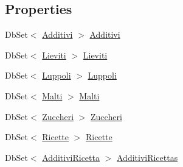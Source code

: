 \subsection*{Properties}
\begin{DoxyCompactItemize}
\item 
Db\+Set$<$ \mbox{\hyperlink{class_brew_day2_1_1_models_1_1_additivi}{Additivi}} $>$ \mbox{\hyperlink{class_brew_day2_1_1_models_1_1_application_db_context_a9da0337ce439d4e85e35127e607097b6}{Additivi}}
\item 
Db\+Set$<$ \mbox{\hyperlink{class_brew_day2_1_1_models_1_1_lieviti}{Lieviti}} $>$ \mbox{\hyperlink{class_brew_day2_1_1_models_1_1_application_db_context_a2e89b28a6766dadf8fa6f86aea1acfa4}{Lieviti}}
\item 
Db\+Set$<$ \mbox{\hyperlink{class_brew_day2_1_1_models_1_1_luppoli}{Luppoli}} $>$ \mbox{\hyperlink{class_brew_day2_1_1_models_1_1_application_db_context_a3ff2ba3ef25c80a70269829124cd0eaf}{Luppoli}}
\item 
Db\+Set$<$ \mbox{\hyperlink{class_brew_day2_1_1_models_1_1_malti}{Malti}} $>$ \mbox{\hyperlink{class_brew_day2_1_1_models_1_1_application_db_context_a8dcfe5f9e1c0435cfb1ff2676871a6e2}{Malti}}
\item 
Db\+Set$<$ \mbox{\hyperlink{class_brew_day2_1_1_models_1_1_zuccheri}{Zuccheri}} $>$ \mbox{\hyperlink{class_brew_day2_1_1_models_1_1_application_db_context_a171f4dd53beae30480e2440c4f8f2fc3}{Zuccheri}}
\item 
Db\+Set$<$ \mbox{\hyperlink{class_brew_day2_1_1_models_1_1_ricette}{Ricette}} $>$ \mbox{\hyperlink{class_brew_day2_1_1_models_1_1_application_db_context_ae59198547c10b3595095ebdcff33b8d5}{Ricette}}
\item 
Db\+Set$<$ \mbox{\hyperlink{class_brew_day2_1_1_models_1_1_additivi_ricetta}{Additivi\+Ricetta}} $>$ \mbox{\hyperlink{class_brew_day2_1_1_models_1_1_application_db_context_a449416c1551536694fe59caa7fbaccd4}{Additivi\+Ricettas}}

\end{DoxyCompactItemize}
